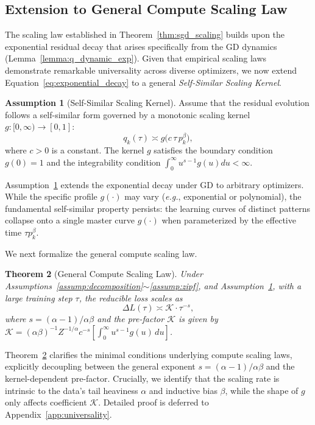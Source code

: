 \documentclass{article}
\theoremstyle{plain}
\newtheorem{theorem}{Theorem}[section]
\theoremstyle{definition}
\newtheorem{assumption}[theorem]{Assumption}
\theoremstyle{remark}
\begin{document}
\subsection{Extension to General Compute Scaling Law}\label{sec:general_compute_scaling}
The scaling law established in Theorem~\ref{thm:sgd_scaling} builds upon the exponential residual decay that arises specifically from the GD dynamics (Lemma~\ref{lemma:q_dynamic_exp}). 
Given that empirical scaling laws demonstrate remarkable universality across diverse optimizers, we now extend Equation~\eqref{eq:exponential_decay} to a general \textit{Self-Similar Scaling Kernel}.
\begin{assumption}[Self-Similar Scaling Kernel] 
    \label{assump:q_dynamic_g}
    Assume that the residual evolution follows a self-similar form governed by a monotonic scaling kernel $g: [0, \infty) \to [0, 1]$:
    \begin{equation*}
        \label{eq:general_kernel}
        q_k(\tau) \asymp g\!\big(c\,\tau\,p_k^\beta\big),
    \end{equation*}
    where $c>0$ is a constant. The kernel $g$ satisfies the boundary condition $g(0)=1$ and the integrability condition $\int_0^\infty u^{s-1}g(u)du < \infty$.
\end{assumption}
Assumption~\ref{assump:q_dynamic_g} extends the exponential decay under GD to arbitrary optimizers. While the specific profile $g(\cdot)$ may vary (\textit{e.g.}, exponential or polynomial), the fundamental self-similar property persists: the learning curves of distinct patterns collapse onto a single master curve $g(\cdot)$ when parameterized by the effective time $\tau p_k^\beta$.

We next formalize the general compute scaling law.
\begin{theorem}[General Compute Scaling Law]
\label{thm:compute_scaling}
Under Assumptions~\ref{assump:decomposition}$\sim$\ref{assump:zipf}, and Assumption~\ref{assump:q_dynamic_g}, with a large training step $\tau$, the reducible loss scales as
\begin{equation*}
    \label{eq:universal_scaling_formula}
    \boxed{\Delta L(\tau) \asymp \mathcal{K} \cdot \tau^{-s},}
\end{equation*}
where $s=(\alpha-1)/\alpha\beta$ and the pre-factor $\mathcal{K}$ is given by $\mathcal{K} = (\alpha\beta)^{-1} Z^{-1/\alpha} c^{-s} [ \int_{0}^{\infty} u^{s-1}g(u)\,du ]$.
\end{theorem}
Theorem~\ref{thm:compute_scaling} clarifies the minimal conditions underlying compute scaling laws, explicitly decoupling between the general exponent $s=(\alpha-1)/\alpha\beta$ and the kernel-dependent pre-factor.
Crucially, we identify that the scaling rate is intrinsic to the data's tail heaviness $\alpha$ and inductive bias $\beta$, while the shape of $g$ only affects coefficient $\mathcal{K}$. 
Detailed proof is deferred to Appendix~\ref{app:universality}.
\end{document}
